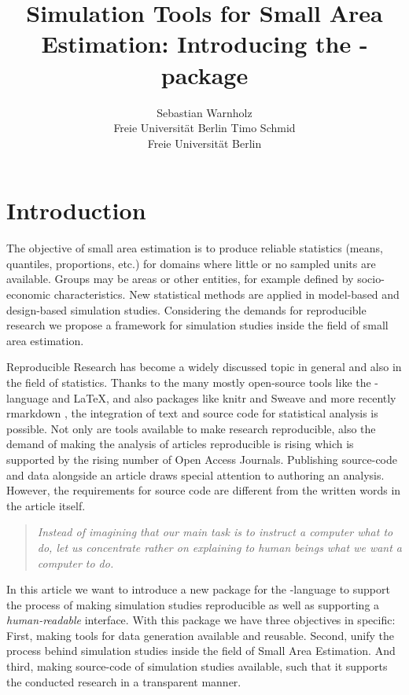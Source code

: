 \documentclass[article]{ajs}
\author{Sebastian Warnholz\\ Freie Universit\"at Berlin \And 
        Timo Schmid \\ Freie Universit\"at Berlin}
\title{Simulation Tools for Small Area Estimation: Introducing the \proglang{R}-package \proglang{saeSim}}
\begin{document}
%
%
%
\section{Introduction}
The objective of small area estimation is to produce reliable statistics (means, quantiles, proportions, etc.) for domains where little or no sampled units are available. Groups may be areas or other entities, for example defined by socio-economic characteristics. New statistical methods are applied in model-based and design-based simulation studies. Considering the demands for reproducible research we propose a framework for simulation studies inside the field of small area estimation.

Reproducible Research has become a widely discussed topic in general and also in the field of statistics. Thanks to the many mostly open-source tools like the -language \citep{r14} and \LaTeX, and also packages like knitr \citep{yihui13} and Sweave \citep{leisch02} and more recently rmarkdown \citep{allaire14}, the integration of text and source code for statistical analysis is possible. Not only are tools available to make research reproducible, also the demand of making the analysis of articles reproducible is rising which is supported by the rising number of Open Access Journals. Publishing source-code and data alongside an article draws special attention to authoring an analysis. However, the requirements for source code are different from the written words in the article itself. 

\begin{quote}
\textit{Instead of imagining that our main task is to instruct a computer what to do, let us concentrate rather on explaining to human beings what we want a computer to do.} \cite[p.99]{knuth92} 
\end{quote}

In this article we want to introduce a new package for the -language to support the process of making simulation studies reproducible as well as supporting a \textit{human-readable} interface. With this package we have three objectives in specific: First, making tools for data generation available and reusable. Second, unify the process behind simulation studies inside the field of Small Area Estimation. And third, making source-code of simulation studies available, such that it supports the conducted research in a transparent manner.
\end{document}
